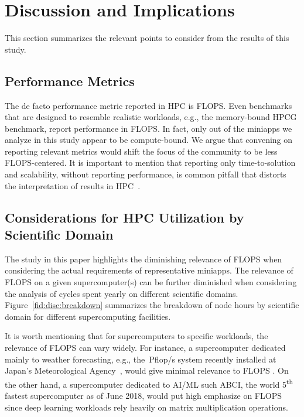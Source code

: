 \section{Discussion and Implications}\label{sec:discuss}
%
%

This section summarizes the relevant points to consider from the results of this study. 

\subsection{Performance Metrics}
The de facto performance metric reported in HPC is FLOPS. Even benchmarks that are designed to resemble realistic workloads, e.g., the memory-bound HPCG benchmark, report performance in FLOPS. In fact, only  out of the  miniapps we analyze in this study appear to be compute-bound. We argue that convening on reporting relevant metrics would shift the focus of the community to be less FLOPS-centered. 
 It is important to mention that reporting only time-to-solution and scalability, without reporting performance, is common pitfall that distorts the interpretation of results in HPC~\cite{hoefler_scientific_2015}.

\subsection{Considerations for HPC Utilization by Scientific Domain}\label{ssec:workload_util}
The study in this paper highlights the diminishing relevance of FLOPS when considering the actual requirements of representative miniapps. The relevance of FLOPS on a given supercomputer(s) can be further diminished when considering the analysis of cycles spent yearly on different scientific domains. Figure~\ref{fid:disc:breakdown} summarizes the breakdown of node hours by scientific domain for different supercomputing facilities. 

It is worth mentioning that for supercomputers to specific workloads, the relevance of FLOPS can vary widely. For instance, a supercomputer dedicated mainly to weather forecasting, e.g., the~\unit[18]{Pflop/s} system recently installed at Japan's Meteorological Agency~\cite{japan_meteorological_agency_jma_jma_2018}, would give minimal relevance to FLOPS . On the other hand, a supercomputer dedicated to AI/ML such ABCI, the world 5\textsuperscript{th} fastest supercomputer as of June 2018, would put high emphasize on FLOPS since deep learning workloads rely heavily on matrix multiplication operations. 

